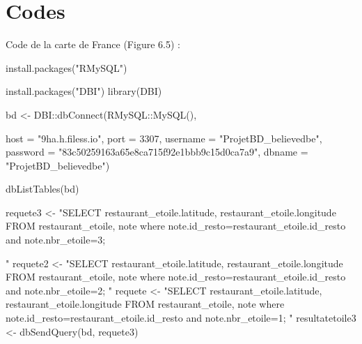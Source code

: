 \documentclass[mstat,12pt]{unswthesis}
\newenvironment{Shaded}{\begin{snugshade}}{\end{snugshade}}
\newcommand{\AttributeTok}[1]{\textcolor[rgb]{0.77,0.63,0.00}{#1}}
\newcommand{\DecValTok}[1]{\textcolor[rgb]{0.00,0.00,0.81}{#1}}
\newcommand{\FunctionTok}[1]{\textcolor[rgb]{0.00,0.00,0.00}{#1}}
\newcommand{\NormalTok}[1]{#1}
\newcommand{\OtherTok}[1]{\textcolor[rgb]{0.56,0.35,0.01}{#1}}
\newcommand{\SpecialCharTok}[1]{\textcolor[rgb]{0.00,0.00,0.00}{#1}}
\newcommand{\StringTok}[1]{\textcolor[rgb]{0.31,0.60,0.02}{#1}}
\begin{document}
\hypertarget{codes}{%
\section*{\texorpdfstring{\textbf{Codes}}{Codes}}\label{codes}}

Code de la carte de France (Figure 6.5) : \tiny

\begin{Shaded}
\begin{Highlighting}[]
\FunctionTok{install.packages}\NormalTok{(}\StringTok{"RMySQL"}\NormalTok{)}

\FunctionTok{install.packages}\NormalTok{(}\StringTok{"DBI"}\NormalTok{)}
\FunctionTok{library}\NormalTok{(DBI)}

\NormalTok{bd }\OtherTok{\textless{}{-}}\NormalTok{ DBI}\SpecialCharTok{::}\FunctionTok{dbConnect}\NormalTok{(RMySQL}\SpecialCharTok{::}\FunctionTok{MySQL}\NormalTok{(),}
                     
                     \AttributeTok{host =} \StringTok{"9ha.h.filess.io"}\NormalTok{, }\AttributeTok{port =} \DecValTok{3307}\NormalTok{,}
                     \AttributeTok{username =} \StringTok{"ProjetBD\_believedbe"}\NormalTok{, }
                     \AttributeTok{password =} \StringTok{"83c50259163a65e8ca715f92e1bbb9c15d0ca7a9"}\NormalTok{, }
                     \AttributeTok{dbname =} \StringTok{"ProjetBD\_believedbe"}\NormalTok{)}

\FunctionTok{dbListTables}\NormalTok{(bd)}

\NormalTok{requete3 }\OtherTok{\textless{}{-}} \StringTok{"SELECT restaurant\_etoile.latitude, restaurant\_etoile.longitude     }
\StringTok{FROM restaurant\_etoile, note                }
\StringTok{where note.id\_resto=restaurant\_etoile.id\_resto}
\StringTok{and note.nbr\_etoile=3;}

\StringTok{"}
\NormalTok{requete2 }\OtherTok{\textless{}{-}} \StringTok{"SELECT restaurant\_etoile.latitude, restaurant\_etoile.longitude     }
\StringTok{FROM restaurant\_etoile, note                }
\StringTok{where note.id\_resto=restaurant\_etoile.id\_resto}
\StringTok{and note.nbr\_etoile=2;}
\StringTok{"}
\NormalTok{requete }\OtherTok{\textless{}{-}} \StringTok{"SELECT restaurant\_etoile.latitude, restaurant\_etoile.longitude      }
\StringTok{FROM restaurant\_etoile, note                }
\StringTok{where note.id\_resto=restaurant\_etoile.id\_resto}
\StringTok{and note.nbr\_etoile=1;}
\StringTok{"}
\NormalTok{resultatetoile3 }\OtherTok{\textless{}{-}} \FunctionTok{dbSendQuery}\NormalTok{(bd, requete3)}


\end{Highlighting}
\end{Shaded}
\end{document}
